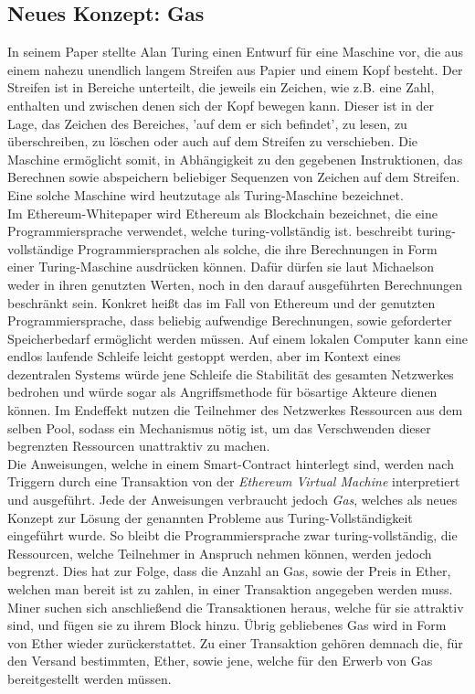 \subsection{Neues Konzept: Gas}
In seinem Paper \cite{turing_1936} stellte Alan Turing einen Entwurf für eine Maschine vor, die aus einem nahezu unendlich langem Streifen aus Papier und einem Kopf besteht. Der Streifen ist in Bereiche unterteilt, die jeweils ein Zeichen, wie z.B. eine Zahl, enthalten und zwischen denen sich der Kopf bewegen kann. Dieser ist in der Lage, das Zeichen des Bereiches, 'auf dem er sich befindet', zu lesen, zu überschreiben, zu löschen oder auch auf dem Streifen zu verschieben. Die Maschine ermöglicht somit, in Abhängigkeit zu den gegebenen Instruktionen, das Berechnen sowie abspeichern beliebiger Sequenzen von Zeichen auf dem Streifen. Eine solche Maschine wird heutzutage als Turing-Maschine bezeichnet.\\

Im Ethereum-Whitepaper \cite{buterin_whitepaper_2013} wird Ethereum als Blockchain bezeichnet, die eine Programmiersprache verwendet, welche turing-vollständig ist. \cite{Michaelson_2020} beschreibt turing-vollständige Programmiersprachen als solche, die ihre Berechnungen in Form einer Turing-Maschine ausdrücken können. Dafür dürfen sie laut Michaelson weder in ihren genutzten Werten, noch in den darauf ausgeführten Berechnungen beschränkt sein. Konkret heißt das im Fall von Ethereum und der genutzten Programmiersprache, dass beliebig aufwendige Berechnungen, sowie geforderter Speicherbedarf ermöglicht werden müssen.
Auf einem lokalen Computer kann eine endlos laufende Schleife leicht gestoppt werden, aber im Kontext eines dezentralen Systems würde jene Schleife die Stabilität des gesamten Netzwerkes bedrohen und würde sogar als Angriffsmethode für bösartige Akteure dienen können. Im Endeffekt nutzen die Teilnehmer des Netzwerkes Ressourcen aus dem selben Pool, sodass ein Mechanismus nötig ist, um das Verschwenden dieser begrenzten Ressourcen unattraktiv zu machen.\\

Die Anweisungen, welche in einem Smart-Contract hinterlegt sind, werden nach Triggern durch eine Transaktion von der \emph{Ethereum Virtual Machine} interpretiert und ausgeführt. Jede der Anweisungen verbraucht jedoch \emph{Gas}, welches als neues Konzept zur Lösung der genannten Probleme aus Turing-Vollständigkeit eingeführt wurde. So bleibt die Programmiersprache zwar turing-vollständig, die Ressourcen, welche Teilnehmer in Anspruch nehmen können, werden jedoch begrenzt. Dies hat zur Folge, dass die Anzahl an Gas, sowie der Preis in Ether, welchen man bereit ist zu zahlen, in einer Transaktion angegeben werden muss. Miner suchen sich anschließend die Transaktionen heraus, welche für sie attraktiv sind, und fügen sie zu ihrem Block hinzu. Übrig gebliebenes Gas wird in Form von Ether wieder zurückerstattet. Zu einer Transaktion gehören demnach die, für den Versand bestimmten, Ether, sowie jene, welche für den Erwerb von Gas bereitgestellt werden müssen.
